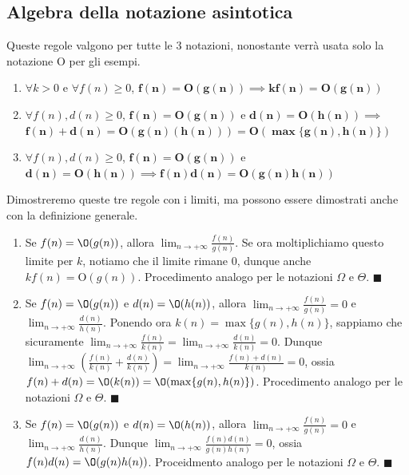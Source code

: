 \documentclass[11pt, a4paper, titlepage, oneside]{scrbook}
\begin{document}
\subsection{Algebra della notazione asintotica}

\begin{Proprieta}
\label{prop-regole-notazione-asintotica}
\NB Queste regole valgono per tutte le 3 notazioni, nonostante verrà usata solo la notazione O per gli esempi.

\begin{enumerate}
    \item $\forall k > 0$ e $\forall f(n) \geq 0$, $\bm{f(n) = \textbf{O}(g(n))} \implies \bm{kf(n) = \textbf{O}(g(n))}$
    \item $\forall f(n), d(n) \geq 0$, $\bm{f(n) = \textbf{O}(g(n))}$ e $\bm{d(n) = \textbf{O}(h(n))} \implies$ $\bm{f(n) + d(n) = \textbf{O}(g(n)(h(n))) = \textbf{O}(\max\{g(n),h(n)\})}$
    \item $\forall f(n), d(n) \geq 0$, $\bm{f(n) = \textbf{O}(g(n))}$ e $\bm{d(n) = \textbf{O}(h(n))} \implies \bm{f(n) d(n) = \textbf{O}(g(n) h(n))}$
\end{enumerate}
\end{Proprieta}

\Dimostrazione \nopagebreak

Dimostreremo queste tre regole con i limiti, ma possono essere dimostrati anche con la definizione generale.

\begin{enumerate}
    \item Se $f(n) = \O(g(n))$, allora $\lim_{n \to + \infty} \frac{f(n)}{g(n)}$. Se ora moltiplichiamo questo limite per $k$, notiamo che il limite rimane $0$, dunque anche $k f(n) = \text{O}(g(n))$. Procedimento analogo per le notazioni $\Omega$ e $\Theta$. $\blacksquare$
    \item Se $f(n) = \O(g(n))$ e $d(n) = \O(h(n))$, allora $\lim_{n \to + \infty} \frac{f(n)}{g(n)} = 0$ e $\lim_{n \to + \infty}\frac{d(n)}{h(n)}$. Ponendo ora $k(n) = \max\{g(n), h(n)\}$, sappiamo che sicuramente $\lim_{n \to + \infty} \frac{f(n)}{k(n)} = \lim_{n \to +\infty} \frac{d(n)}{k(n)} = 0$. Dunque $\lim_{n \to +\infty} \left(  \frac{f(n)}{k(n)} + \frac{d(n)}{k(n)}\right) = \lim_{n \to +\infty} \frac{f(n) + d(n)}{k(n)} = 0$, ossia \mbox{$f(n) + d(n) = \O(k(n)) = \O(\max\{g(n), h(n)\})$}. Procedimento analogo per le notazioni $\Omega$ e $\Theta$. $\blacksquare$
    \item Se $f(n) = \O(g(n))$ e $d(n) = \O(h(n))$, allora $\lim_{n \to + \infty} \frac{f(n)}{g(n)} = 0$ e $\lim_{n \to + \infty}\frac{d(n)}{h(n)}$. Dunque $\lim_{n \to +\infty} \frac{f(n) d(n)}{g(n)h(n)} = 0$, ossia $f(n) d(n) = \O(g(n) h(n))$. Proceidmento analogo per le notazioni $\Omega$ e $\Theta$. $\blacksquare$ 
\end{enumerate}
\end{document}
